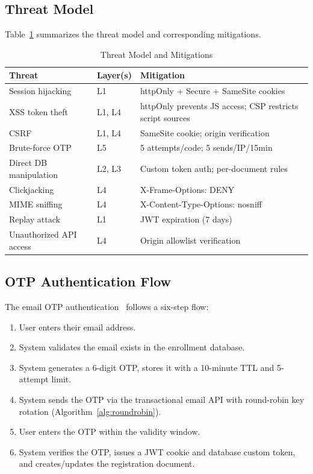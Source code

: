 \documentclass[11pt,a4paper]{article}
\theoremstyle{plain}
\theoremstyle{definition}
\begin{document}
\subsection{Threat Model}

Table~\ref{tab:threats} summarizes the threat model and corresponding mitigations.

\begin{table}[htbp]
\centering
\caption{Threat Model and Mitigations}
\label{tab:threats}
\small
\renewcommand{\arraystretch}{1.15}
\begin{tabular}{@{}p{2.8cm}p{1.5cm}p{5cm}@{}}
\toprule
\textbf{Threat} & \textbf{Layer(s)} & \textbf{Mitigation} \\
\midrule
Session hijacking & L1 & httpOnly + Secure + SameSite cookies \\
XSS token theft & L1, L4 & httpOnly prevents JS access; CSP restricts script sources \\
CSRF & L1, L4 & SameSite cookie; origin verification \\
Brute-force OTP & L5 & 5 attempts/code; 5 sends/IP/15min \\
Direct DB manipulation & L2, L3 & Custom token auth; per-document rules \\
Clickjacking & L4 & X-Frame-Options: DENY \\
MIME sniffing & L4 & X-Content-Type-Options: nosniff \\
Replay attack & L1 & JWT expiration (7 days) \\
Unauthorized API access & L4 & Origin allowlist verification \\
\bottomrule
\end{tabular}
\end{table}

\subsection{OTP Authentication Flow}

The email OTP authentication~\cite{mraihi2011} follows a six-step flow:
\begin{enumerate}[noitemsep,topsep=3pt]
    \item User enters their email address.
    \item System validates the email exists in the enrollment database.
    \item System generates a 6-digit OTP, stores it with a 10-minute TTL and 5-attempt limit.
    \item System sends the OTP via the transactional email API with round-robin key rotation (Algorithm~\ref{alg:roundrobin}).
    \item User enters the OTP within the validity window.
    \item System verifies the OTP, issues a JWT cookie and database custom token, and creates/updates the registration document.
\end{enumerate}
\end{document}
